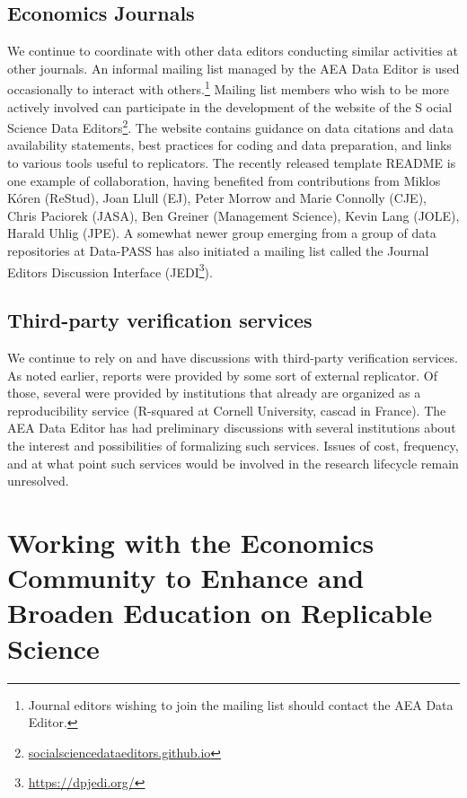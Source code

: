 \documentclass[PP]{AEA}
\newcommand{\urlcite}[2]{#2\footnote{\url{#1}}}
\begin{document}
\subsection{Economics Journals}

We continue to coordinate with other data editors conducting similar activities at other journals. An informal mailing list managed by the AEA Data Editor is used occasionally to interact with others.\footnote{Journal editors wishing to join the mailing list should contact the AEA Data Editor.} Mailing list members who wish to be more actively involved can participate in the development of the \urlcite{socialsciencedataeditors.github.io}{website of the S ocial Science Data Editors}. The website contains guidance on data citations and data availability statements, best practices for coding and data preparation, and links to various tools useful to replicators. The recently released template README is one example of collaboration, having benefited from contributions from Miklos Kóren (\ac{ReStud}), Joan Llull (\ac{EJ}), Peter Morrow and Marie Connolly (\ac{CJE}), Chris Paciorek (JASA), Ben Greiner (Management Science),  Kevin Lang (JOLE), Harald Uhlig (JPE). A somewhat newer group emerging from a group of data repositories at Data-PASS has also initiated a mailing list called the Journal Editors Discussion Interface (\urlcite{https://dpjedi.org/}{JEDI}).


\subsection{Third-party verification services}
\label{sec:3rdparty}


We continue to rely on and have discussions with third-party verification services. As noted earlier, \jiramcsexternal{} reports were provided by some sort of external replicator. Of those, several were provided by institutions that already are organized as a reproducibility service (R-squared at Cornell University, cascad in France). The AEA Data Editor has had preliminary discussions with several institutions about the interest and possibilities of formalizing such services. Issues of cost, frequency, and at what point such services would be involved in the research lifecycle remain unresolved. 



\section{Working with the Economics Community to Enhance and Broaden Education on Replicable Science}
\end{document}
